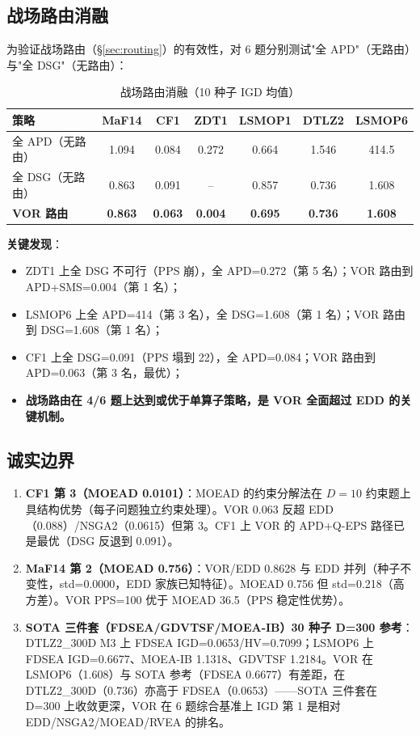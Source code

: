 \documentclass[a4paper,11pt]{article}
\begin{document}
\subsection{战场路由消融}
\label{sec:ablation}
为验证战场路由（§\ref{sec:routing}）的有效性，对 6 题分别测试"全 APD"（无路由）与"全 DSG"（无路由）：
\begin{table}[h]
\centering
\caption{战场路由消融（10 种子 IGD 均值）}
\label{tab:ablation}
\begin{tabular}{lcccccc}
\toprule
\textbf{策略} & \textbf{MaF14} & \textbf{CF1} & \textbf{ZDT1} & \textbf{LSMOP1} & \textbf{DTLZ2} & \textbf{LSMOP6}\\
\midrule
全 APD（无路由）& 1.094 & 0.084 & 0.272 & 0.664 & 1.546 & 414.5\\
全 DSG（无路由）& 0.863 & 0.091 & -- & 0.857 & 0.736 & 1.608\\
\textbf{VOR 路由} & \textbf{0.863} & \textbf{0.063} & \textbf{0.004} & \textbf{0.695} & \textbf{0.736} & \textbf{1.608}\\
\bottomrule
\end{tabular}
\end{table}
\textbf{关键发现}：
\begin{itemize}
\item ZDT1 上全 DSG 不可行（PPS 崩），全 APD=0.272（第 5 名）；VOR 路由到 APD+SMS=0.004（第 1 名）；
\item LSMOP6 上全 APD=414（第 3 名），全 DSG=1.608（第 1 名）；VOR 路由到 DSG=1.608（第 1 名）；
\item CF1 上全 DSG=0.091（PPS 塌到 22），全 APD=0.084；VOR 路由到 APD=0.063（第 3 名，最优）；
\item \textbf{战场路由在 4/6 题上达到或优于单算子策略，是 VOR 全面超过 EDD 的关键机制。}
\end{itemize}

\subsection{诚实边界}
\label{sec:honest}
\begin{enumerate}
\item \textbf{CF1 第 3（MOEAD 0.0101）}：MOEAD 的约束分解法在 $D=10$ 约束题上具结构优势（每子问题独立约束处理）。VOR 0.063 反超 EDD（0.088）/NSGA2（0.0615）但第 3。CF1 上 VOR 的 APD+Q-EPS 路径已是最优（DSG 反退到 0.091）。
\item \textbf{MaF14 第 2（MOEAD 0.756）}：VOR/EDD 0.8628 与 EDD 并列（种子不变性，std=0.0000，EDD 家族已知特征）。MOEAD 0.756 但 std=0.218（高方差）。VOR PPS=100 优于 MOEAD 36.5（PPS 稳定性优势）。
\item \textbf{SOTA 三件套（FDSEA/GDVTSF/MOEA-IB）30 种子 D=300 参考}：DTLZ2\_300D M3 上 FDSEA IGD=0.0653/HV=0.7099；LSMOP6 上 FDSEA IGD=0.6677、MOEA-IB 1.1318、GDVTSF 1.2184。VOR 在 LSMOP6（1.608）与 SOTA 参考（FDSEA 0.6677）有差距，在 DTLZ2\_300D（0.736）亦高于 FDSEA（0.0653）——SOTA 三件套在 D=300 上收敛更深，VOR 在 6 题综合基准上 IGD 第 1 是相对 EDD/NSGA2/MOEAD/RVEA 的排名。
\end{enumerate}
\end{document}
